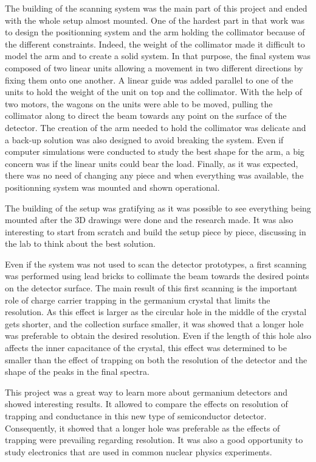 \documentclass[11pt,a4paper]{article}
\begin{document}
The building of the scanning system was the main part of this project and ended with the whole setup almost mounted. One of the hardest part in that work was to design the positionning system and the arm holding the collimator because of the different constraints. Indeed, the weight of the collimator made it difficult to model the arm and to create a solid system. In that purpose, the final system was composed of two linear units allowing a movement in two different directions by fixing them onto one another. A linear guide was added parallel to one of the units to hold the weight of the unit on top and the collimator. With the help of two motors, the wagons on the units were able to be moved, pulling the collimator along to direct the beam towards any point on the surface of the detector. The creation of the arm needed to hold the collimator was delicate and a back-up solution was also designed to avoid breaking the system. Even if computer simulations were conducted to study the best shape for the arm, a big concern was if the linear units could bear the load. Finally, as it was expected, there was no need of changing any piece and when everything was available, the positionning system was mounted and shown operational.

The building of the setup was gratifying as it was possible to see everything being mounted after the 3D drawings were done and the research made. It was also interesting to start from scratch and build the setup piece by piece, discussing in the lab to think about the best solution.

Even if the system was not used to scan the detector prototypes, a first scanning was performed using lead bricks to collimate the beam towards the desired points on the detector surface. The main result of this first scanning is the important role of charge carrier trapping in the germanium crystal that limits the resolution. As this effect is larger as the circular hole in the middle of the crystal gets shorter, and the collection surface smaller, it was showed that a longer hole was preferable to obtain the desired resolution. Even if the length of this hole also affects the inner capacitance of the crystal, this effect was determined to be smaller than the effect of trapping on both the resolution of the detector and the shape of the peaks in the final spectra.

This project was a great way to learn more about germanium detectors and showed interesting results. It allowed to compare the effects on resolution of trapping and conductance in this new type of semiconductor detector. Consequently, it showed that a longer hole was preferable as the effects of trapping were prevailing regarding resolution. It was also a good opportunity to study electronics that are used in common nuclear physics experiments.

\newpage



\end{document}
